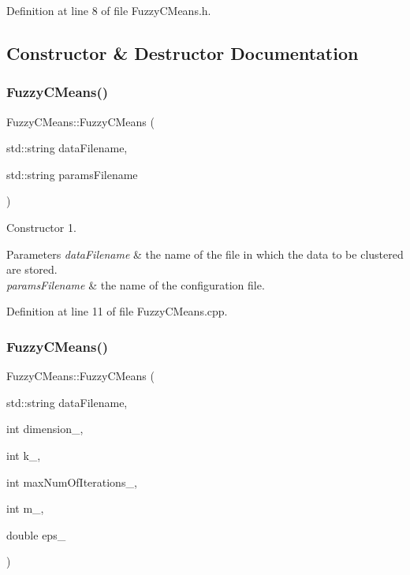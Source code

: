 Definition at line 8 of file Fuzzy\+C\+Means.\+h.



\subsection{Constructor \& Destructor Documentation}
\mbox{\label{class_fuzzy_c_means_adafa89c36e0ba527d59114193afa1a95}} 
\subsubsection{Fuzzy\+C\+Means()\hspace{0.1cm}{\footnotesize\ttfamily [1/2]}}
{\footnotesize\ttfamily Fuzzy\+C\+Means\+::\+Fuzzy\+C\+Means (\begin{DoxyParamCaption}\item[{std\+::string}]{data\+Filename,  }\item[{std\+::string}]{params\+Filename }\end{DoxyParamCaption})}

Constructor 1. 
\begin{DoxyParams}{Parameters}
{\em data\+Filename} & the name of the file in which the data to be clustered are stored. \\
\hline
{\em params\+Filename} & the name of the configuration file. \\
\hline
\end{DoxyParams}


Definition at line 11 of file Fuzzy\+C\+Means.\+cpp.

\mbox{\label{class_fuzzy_c_means_a8b5bc87675a4a267b781581a927859c7}} 
\subsubsection{Fuzzy\+C\+Means()\hspace{0.1cm}{\footnotesize\ttfamily [2/2]}}
{\footnotesize\ttfamily Fuzzy\+C\+Means\+::\+Fuzzy\+C\+Means (\begin{DoxyParamCaption}\item[{std\+::string}]{data\+Filename,  }\item[{int}]{dimension\+\_\+,  }\item[{int}]{k\+\_\+,  }\item[{int}]{max\+Num\+Of\+Iterations\+\_\+,  }\item[{int}]{m\+\_\+,  }\item[{double}]{eps\+\_\+ }\end{DoxyParamCaption})}

